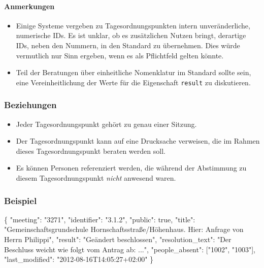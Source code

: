 \documentclass[,a4paper]{article}
\newenvironment{Shaded}{}{}
\newcommand{\DataTypeTok}[1]{\textcolor[rgb]{0.56,0.13,0.00}{{#1}}}
\newcommand{\DecValTok}[1]{\textcolor[rgb]{0.25,0.63,0.44}{{#1}}}
\newcommand{\StringTok}[1]{\textcolor[rgb]{0.25,0.44,0.63}{{#1}}}
\newcommand{\NormalTok}[1]{{#1}}
\begin{document}
\paragraph{Anmerkungen}

\begin{itemize}
\item
  Einige Systeme vergeben zu Tagesordnungspunkten intern
  unveränderliche, numerische IDs. Es ist unklar, ob es zusätzlichen
  Nutzen bringt, derartige IDs, neben den Nummern, in den Standard zu
  übernehmen. Dies würde vermutlich nur Sinn ergeben, wenn es als
  Pflichtfeld gelten könnte.
\item
  Teil der Beratungen über einheitliche Nomenklatur im Standard sollte
  sein, eine Vereinheitlichung der Werte für die Eigenschaft
  \texttt{result} zu diskutieren.
\end{itemize}

\subsubsection{Beziehungen}

\begin{itemize}
\item
  Jeder Tagesordnungspunkt gehört zu genau einer Sitzung.
\item
  Der Tagesordnungspunkt kann auf eine Drucksache verweisen, die im
  Rahmen dieses Tagesordnungspunkt beraten werden soll.
\item
  Es können Personen referenziert werden, die während der Abstimmung zu
  diesem Tagesordnungspunkt \emph{nicht} anwesend waren.
\end{itemize}

\subsubsection{Beispiel}

\begin{Shaded}
\begin{Highlighting}[]
\NormalTok{\{}
    \DataTypeTok{"meeting"}\NormalTok{: }\StringTok{"3271"}\NormalTok{,}
    \DataTypeTok{"identifier"}\NormalTok{: }\StringTok{"3.1.2"}\NormalTok{,}
    \DataTypeTok{"public"}\NormalTok{: }\DecValTok{true}\NormalTok{,}
    \DataTypeTok{"title"}\NormalTok{: }\StringTok{"Gemeinschaftsgrundschule Hornschaftsstraße/Höhenhaus. Hier: Anfrage von Herrn Philippi"}\NormalTok{,}
    \DataTypeTok{"result"}\NormalTok{: }\StringTok{"Geändert beschlossen"}\NormalTok{,}
    \DataTypeTok{"resolution_text"}\NormalTok{: }\StringTok{"Der Beschluss weicht wie folgt vom Antrag ab: ..."}\NormalTok{,}
    \DataTypeTok{"people_absent"}\NormalTok{: [}\StringTok{"1002"}\NormalTok{, }\StringTok{"1003"}\NormalTok{],}
    \DataTypeTok{"last_modified"}\NormalTok{: }\StringTok{"2012-08-16T14:05:27+02:00"}
\NormalTok{\}}
\end{Highlighting}
\end{Shaded}
\end{document}
